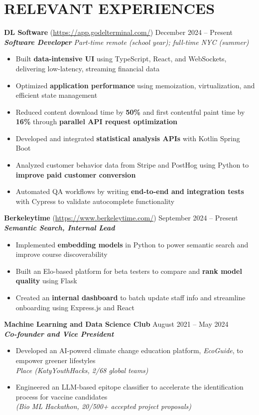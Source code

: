 \section*{RELEVANT EXPERIENCES}

\noindent
\textbf{DL Software} (\href{https://app.godelterminal.com/}{https://app.godelterminal.com/}) \hfill December 2024 -- Present \\
\textbf{\textit{Software Developer}} \hfill \textit{Part-time remote (school year); full-time NYC (summer)}
\begin{itemize}
	\item Built \textbf{data-intensive UI} using TypeScript, React, and WebSockets, delivering low-latency, streaming financial data
	\item Optimized \textbf{application performance} using memoization, virtualization, and efficient state management
	\item Reduced content download time by \textbf{50\%} and first contentful paint time by \textbf{16\%} through \textbf{parallel API request optimization}
	\item Developed and integrated \textbf{statistical analysis APIs} with Kotlin Spring Boot
	\item Analyzed customer behavior data from Stripe and PostHog using Python to \textbf{improve paid customer conversion}
	\item Automated QA workflows by writing \textbf{end-to-end and integration tests} with Cypress to validate autocomplete functionality
\end{itemize}

\noindent
\textbf{Berkeleytime} (\href{https://www.berkeleytime.com/}{https://www.berkeleytime.com/}) \hfill September 2024 -- Present \\
\textbf{\textit{Semantic Search, Internal Lead}}
\begin{itemize}
	\item Implemented \textbf{embedding models} in Python to power semantic search and improve course discoverability
	\item Built an Elo-based platform for beta testers to compare and \textbf{rank model quality} using Flask
	\item Created an \textbf{internal dashboard} to batch update staff info and streamline onboarding using Express.js and React
\end{itemize}

\noindent
\textbf{Machine Learning and Data Science Club} \hfill August 2021 -- May 2024 \\
\textbf{\textit{Co-founder and Vice President}}
\begin{itemize}
	\item Developed an AI-powerd climate change education platform, \textit{EcoGuide}, to empower greener lifestyles \\ \textit{ Place (KatyYouthHacks, 2/68 global teams)}
	\item Engineered an LLM-based epitope classifier to accelerate the identification process for vaccine candidates \\ \textit{(Bio ML Hackathon, 20/500+ accepted project proposals)}
\end{itemize}

